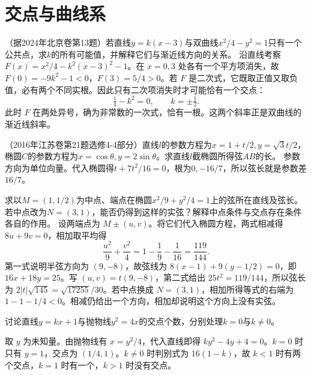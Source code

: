 \par\addvspace{12pt}

\section{交点与曲线系}

（据2024年北京卷第13题）若直线\(y=k(x-3)\)与双曲线\(x^2/4-y^2=1\)只有一个公共点，求\(k\)的所有可能值，并解释它们与渐近线方向的关系。
\solutionanswer
沿直线考察 \(F(x)=x^2/4-k^2(x-3)^2-1\)。在 \(x=0,3\) 处各有一个平方项消失，故 \(F(0)=-9k^2-1<0\)，\(F(3)=5/4>0\)。若 \(F\) 是二次式，它既取正值又取负值，必有两个不同实根。因此只有二次项消失时才可能恰有一个交点：
\[
    \tfrac14-k^2=0,\qquad k=\pm\tfrac12 .
\]
此时 \(F\) 在两处异号，确为非常数的一次式，恰有一根。这两个斜率正是双曲线的渐近线斜率。




（2016年江苏卷第21题选修4-4部分）直线\(l\)的参数方程为\(x=1+t/2,y=\sqrt3t/2\)，椭圆\(C\)的参数方程为\(x=\cos\theta,y=2\sin\theta\)。求直线\(l\)截椭圆所得弦\(AB\)的长。
\solutionanswer
参数方向为单位向量。代入椭圆得\(t+7t^2/16=0\)，根为\(0,-16/7\)，所以弦长就是参数差\(16/7\)。


求以\(M=(1,1/2)\)为中点、端点在椭圆\(x^2/9+y^2/4=1\)上的弦所在直线及弦长。若中点改为\(N=(3,1)\)，能否仍得到这样的实弦？解释中点条件与交点存在条件各自的作用。
\solutionanswer
设两端点为 \(M\pm(u,v)\)。将它们代入椭圆方程，两式相减得 \(8u+9v=0\)，相加取平均得
\[
 \frac{u^2}{9}+\frac{v^2}{4}=1-\frac19-\frac1{16}=\frac{119}{144}.
\]
第一式说明半弦方向为 \((9,-8)\)，故弦线为 \(8(x-1)+9(y-1/2)=0\)，即 \(16x+18y=25\)。写 \((u,v)=t(9,-8)\)，第二式给出 \(25t^2=119/144\)，所以弦长为 \(2|t|\sqrt{145}=\sqrt{17255}/30\)。若中点换成 \(N=(3,1)\)，相加所得等式的右端为 \(1-1-1/4<0\)。相减仍给出一个方向，相加却说明这个方向上没有实弦。


讨论直线\(y=kx+1\)与抛物线\(y^2=4x\)的交点个数，分别处理\(k=0\)与\(k\ne0\)。
\par
\solutionanswer
取 \(y\) 为未知量。由抛物线有 \(x=y^2/4\)，代入直线即得 \(ky^2-4y+4=0\)。\(k=0\) 时只有 \(y=1\)，交点为 \((1/4,1)\)。\(k\ne0\) 时判别式为 \(16(1-k)\)，故 \(k<1\) 时有两个交点，\(k=1\) 时有一个，\(k>1\) 时没有交点。




